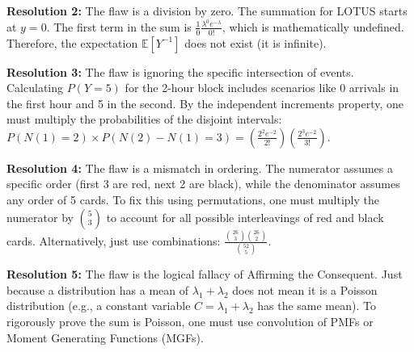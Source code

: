 \documentclass[11pt]{article}
\theoremstyle{definition}
\theoremstyle{remark}
\begin{document}
\textbf{Resolution 2:} The flaw is a division by zero. The summation for LOTUS starts at $y=0$. The first term in the sum is $\frac{1}{0} \frac{\lambda^0 e^{-\lambda}}{0!}$, which is mathematically undefined. Therefore, the expectation $\mathbb{E}[Y^{-1}]$ does not exist (it is infinite).

\textbf{Resolution 3:} The flaw is ignoring the specific intersection of events. Calculating $P(Y=5)$ for the 2-hour block includes scenarios like 0 arrivals in the first hour and 5 in the second. By the independent increments property, one must multiply the probabilities of the disjoint intervals: $P(N(1)=2) \times P(N(2)-N(1)=3) = \left(\frac{2^2 e^{-2}}{2!}\right) \left(\frac{2^3 e^{-2}}{3!}\right)$.

\textbf{Resolution 4:} The flaw is a mismatch in ordering. The numerator assumes a specific order (first 3 are red, next 2 are black), while the denominator assumes any order of 5 cards. To fix this using permutations, one must multiply the numerator by $\binom{5}{3}$ to account for all possible interleavings of red and black cards. Alternatively, just use combinations: $\frac{\binom{26}{3}\binom{26}{2}}{\binom{52}{5}}$.

\textbf{Resolution 5:} The flaw is the logical fallacy of Affirming the Consequent. Just because a distribution has a mean of $\lambda_1 + \lambda_2$ does not mean it is a Poisson distribution (e.g., a constant variable $C = \lambda_1 + \lambda_2$ has the same mean). To rigorously prove the sum is Poisson, one must use convolution of PMFs or Moment Generating Functions (MGFs).
\end{document}
